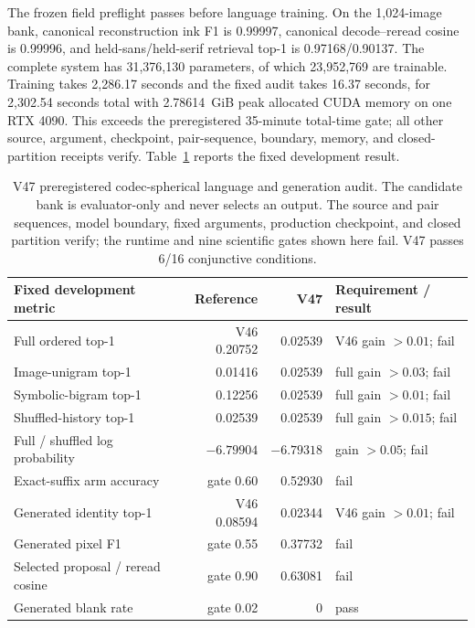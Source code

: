 \documentclass[11pt]{article}
\begin{document}
The frozen field preflight passes before language training. On the 1,024-image
bank, canonical reconstruction ink F1 is 0.99997, canonical decode--reread
cosine is 0.99996, and held-sans/held-serif retrieval top-1 is
0.97168/0.90137. The complete system has 31,376,130 parameters, of which
23,952,769 are trainable. Training takes 2,286.17 seconds and the fixed audit
takes 16.37 seconds, for 2,302.54 seconds total with 2.78614~GiB peak allocated
CUDA memory on one RTX 4090. This exceeds the preregistered 35-minute total-time
gate; all other source, argument, checkpoint, pair-sequence, boundary, memory,
and closed-partition receipts verify. Table~\ref{tab:v47language} reports the
fixed development result.

\begin{table}[h!]
\centering
\small
\begin{tabular}{lrrl}
\toprule
Fixed development metric & Reference & V47 & Requirement / result \\
\midrule
Full ordered top-1 & V46 0.20752 & 0.02539 & V46 gain $>0.01$; fail \\
Image-unigram top-1 & 0.01416 & 0.02539 & full gain $>0.03$; fail \\
Symbolic-bigram top-1 & 0.12256 & 0.02539 & full gain $>0.01$; fail \\
Shuffled-history top-1 & 0.02539 & 0.02539 & full gain $>0.015$; fail \\
Full / shuffled log probability & $-6.79904$ & $-6.79318$ & gain $>0.05$; fail \\
Exact-suffix arm accuracy & gate 0.60 & 0.52930 & fail \\
Generated identity top-1 & V46 0.08594 & 0.02344 & V46 gain $>0.01$; fail \\
Generated pixel F1 & gate 0.55 & 0.37732 & fail \\
Selected proposal / reread cosine & gate 0.90 & 0.63081 & fail \\
Generated blank rate & gate 0.02 & 0 & pass \\
\bottomrule
\end{tabular}
\caption{V47 preregistered codec-spherical language and generation audit. The
candidate bank is evaluator-only and never selects an output. The source and
pair sequences, model boundary, fixed arguments, production checkpoint, and
closed partition verify; the runtime and nine scientific gates shown here
fail. V47 passes 6/16 conjunctive conditions.}
\label{tab:v47language}
\end{table}
\end{document}

